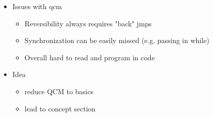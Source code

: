 \begin{itemize}
    \item Issues with qcm
    \begin{itemize}
        \item Reversibility always requires "back" jmps
        \item Synchronization can be easily missed (e.g. passing in while)
        \item Overall hard to read and program in code 
    \end{itemize}
    \item Idea 
    \begin{itemize}
        \item reduce QCM to basics
        \item lead to concept section
    \end{itemize}
\end{itemize}